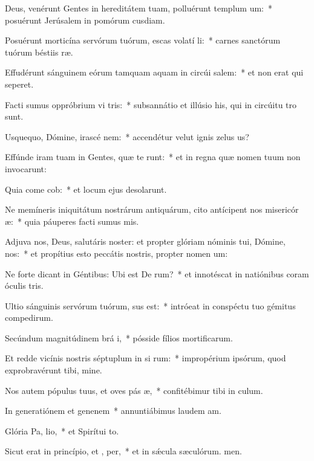 \item Deus, venérunt Gentes in hereditátem tuam, polluérunt templum  um:~* posuérunt Jerúsalem in pomórum cusdiam.
\item Posuérunt morticína servórum tuórum, escas volatí li:~* carnes sanctórum tuórum béstiis ræ.
\item Effudérunt sánguinem eórum tamquam aquam in circúi salem:~* et non erat qui seperet.
\item Facti sumus oppróbrium vi tris:~* subsannátio et illúsio his, qui in circúitu tro sunt.
\item Usquequo, Dómine, irascé  nem:~* accendétur velut ignis zelus us?
\item Effúnde iram tuam in Gentes, quæ te  runt:~* et in regna quæ nomen tuum non invocarunt:
\item Quia come cob:~* et locum ejus desolarunt.
\item Ne memíneris iniquitátum nostrárum antiquárum, cito antícipent nos misericór æ:~* quia páuperes facti sumus mis.
\item Adjuva nos, Deus, salutáris noster: et propter glóriam nóminis tui, Dómine,  nos:~* et propítius esto peccátis nostris, propter nomen um:
\item Ne forte dicant in Géntibus: Ubi est De rum?~* et innotéscat in natiónibus coram óculis tris.
\item Ultio sánguinis servórum tuórum,  sus est:~* intróeat in conspéctu tuo gémitus compedirum.
\item Secúndum magnitúdinem brá i,~* pósside fílios mortificarum.
\item Et redde vicínis nostris séptuplum in si rum:~* impropérium ipsórum, quod exprobravérunt tibi, mine.
\item Nos autem pópulus tuus, et oves pás æ,~* confitébimur tibi in culum.
\item In generatiónem et genenem~* annuntiábimus laudem am.
\item Glória Pa,  lio,~* et Spirítui to.
\item Sicut erat in princípio, et ,  per,~* et in sǽcula sæculórum. men.
